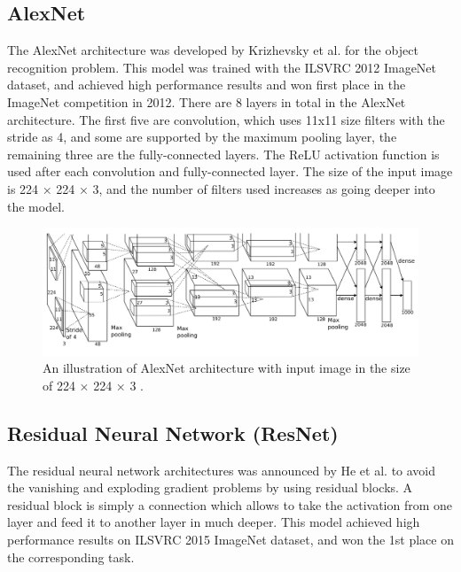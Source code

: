 \subsection{AlexNet}

The AlexNet architecture was developed by Krizhevsky et al. \cite{AlexNet} for the object recognition problem. This model was trained with the ILSVRC 2012 ImageNet \cite{imagenet} dataset, and achieved high performance results and won first place in the ImageNet competition in 2012. There are 8 layers in total in the AlexNet architecture. The first five are convolution, which uses 11x11 size filters with the stride as 4, and some are supported by the maximum pooling layer, the remaining three are the fully-connected layers. The ReLU activation function is used after each convolution and fully-connected layer. The size of the input image is 224 × 224 × 3, and the number of filters used increases as going deeper into the model.

\begin{figure}[h]
	\centering
	\includegraphics[width=\linewidth]{fig/alexnet_arch.png}
	\caption{An illustration of AlexNet architecture with input image in the size of 224 × 224 × 3 \cite{AlexNet}.}
	\label{fig:alexnet_arch}
\end{figure}

\subsection{Residual Neural Network (ResNet)}

The residual neural network architectures was announced by He et al. \cite{ResNet} to avoid the vanishing and exploding gradient problems by using residual blocks. A residual block is simply a connection which allows to take the activation from one layer and feed it to another layer in much deeper. This model achieved high performance results on ILSVRC 2015 ImageNet \cite{imagenet} dataset, and won the 1st place on the corresponding task.

